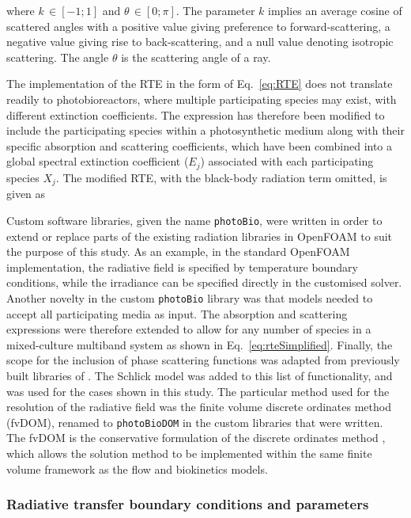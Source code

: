
%
where $k \, \in [-1;1]$ and $\theta \, \in [0;\pi]$. The parameter $k$ implies an average cosine of scattered angles with a positive value giving preference to forward-scattering, a negative value giving rise to back-scattering, and a null value denoting isotropic scattering. The angle $\theta$ is the scattering angle of a ray.
\skippingparagraph

The implementation of the RTE in the form of Eq.\ \ref{eq:RTE} does not translate readily to photobioreactors, where multiple participating species may exist, with different extinction coefficients. The expression has therefore been modified to include the participating species within a photosynthetic medium along with their specific absorption and scattering coefficients, which have been combined into a global spectral extinction coefficient ($E_j$) associated with each participating species $X_j$. The modified RTE, with the black-body radiation term omitted, is given as



Custom software libraries, given the name \texttt{photoBio}, were written in order to extend or replace parts of the existing radiation libraries in OpenFOAM to suit the purpose of this study. As an example, in the standard OpenFOAM implementation, the radiative field is specified by temperature boundary conditions, while the irradiance can be specified directly in the customised solver.  Another novelty in the custom \texttt{photoBio} library was that models needed to accept all participating media as input. The absorption and scattering expressions were therefore extended to allow for any number of species in a mixed-culture multiband system as shown in Eq.\ \ref{eq:rteSimplified}. Finally, the scope for the inclusion of phase scattering functions was adapted from previously built libraries of \cite{kong2014}. The Schlick model was added to this list of functionality, and was used for the cases shown in this study.
\skippingparagraph
The particular method used for the resolution of the radiative field was the finite volume discrete ordinates method (fvDOM), renamed to \texttt{photoBioDOM} in the custom libraries that were written. The fvDOM is the conservative formulation of the discrete ordinates method \cite{raithby1990}, which allows the solution method to be implemented within the same finite volume framework as the flow and biokinetics models.


\subsubsection{Radiative transfer boundary conditions and parameters}

